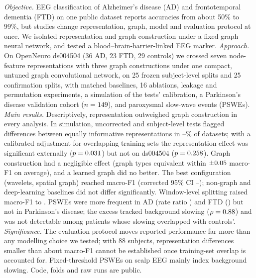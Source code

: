 \textit{Objective.} EEG classification of Alzheimer's disease (AD) and frontotemporal dementia (FTD) on one
public dataset reports accuracies from about 50\% to 99\%, but studies change representation, graph, model and
evaluation protocol at once. We isolated representation and graph construction under a fixed graph neural
network, and tested a blood--brain-barrier-linked EEG marker.
\textit{Approach.} On OpenNeuro ds004504 (36 AD, 23 FTD, 29 controls) we crossed seven node-feature
representations with three graph constructions under one compact, untuned graph convolutional network, on 25
frozen subject-level splits and 25 confirmation splits, with matched baselines, 16 ablations, leakage and
permutation experiments, a simulation of the tests' calibration, a Parkinson's disease validation cohort ($n=149$), and paroxysmal slow-wave events (PSWEs).
\textit{Main results.} Descriptively, representation outweighed graph construction in every analysis. In simulation, uncorrected and subject-level tests flagged differences between equally informative representations in
\simCorrSubjLo--\simNullUncorr\% of datasets; with a calibrated adjustment for overlapping training sets
the representation effect was significant externally ($p=0.031$) but not on ds004504 ($p=0.258$). Graph construction had a negligible effect (graph types equivalent within $\pm0.05$ macro-F1 on average), and a learned graph did no better. The best configuration (wavelets, spatial graph) reached macro-F1
\confFOne{} (corrected 95\% CI \confFOneNbLo{}--\confFOneNbHi{}); non-graph and deep-learning baselines did not differ
significantly. Window-level splitting raised macro-F1 to \cleakPThreespatialLeakySubj{}. PSWEs were more frequent
in AD (rate ratio \psweAdjADRR{}) and FTD (\psweAdjFTDRR{}) but not in Parkinson's disease; the excess tracked
background slowing ($\rho=0.88$) and was not detectable among patients whose slowing overlapped with
controls'.
\textit{Significance.} The evaluation protocol moves reported performance far more than any modelling choice we
tested; with 88 subjects, representation differences smaller than about \bootMde{} macro-F1 cannot be established
once training-set overlap is accounted for. Fixed-threshold PSWEs on scalp EEG mainly index background slowing. Code, folds and raw runs are public.
